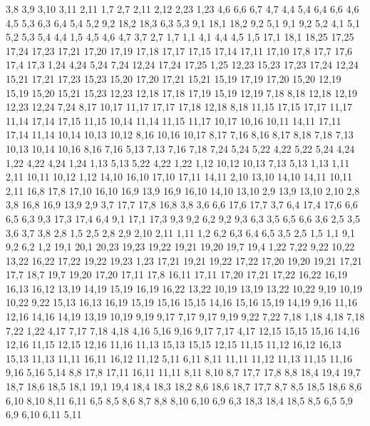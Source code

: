 3,8
3,9
3,10
3,11
2,11
%
1,7
2,7
2,11
2,12
2,23
1,23
%
4,6
6,6
6,7
4,7
%
4,4
5,4
6,4
6,6
4,6
4,5
%
5,3
6,3
6,4
5,4
%
5,2
9,2
18,2
18,3
6,3
5,3
%
9,1
18,1
18,2
9,2
%
5,1
9,1
9,2
5,2
%
4,1
5,1
5,2
5,3
5,4
4,4
%
1,5
4,5
4,6
4,7
3,7
2,7
1,7
%
1,1
4,1
4,4
4,5
1,5
17,1
18,1
18,25
17,25
17,24
17,23
17,21
17,20
17,19
17,18
17,17
17,15
17,14
17,11
17,10
17,8
17,7
17,6
17,4
17,3
%
1,24
4,24
5,24
7,24
12,24
17,24
17,25
1,25
%
12,23
15,23
17,23
17,24
12,24
%
15,21
17,21
17,23
15,23
%
15,20
17,20
17,21
15,21
%
15,19
17,19
17,20
15,20
%
12,19
15,19
15,20
15,21
15,23
12,23
%
12,18
17,18
17,19
15,19
12,19
%
7,18
8,18
12,18
12,19
12,23
12,24
7,24
%
8,17
10,17
11,17
17,17
17,18
12,18
8,18
%
11,15
17,15
17,17
11,17
%
11,14
17,14
17,15
11,15
%
10,14
11,14
11,15
11,17
10,17
10,16
%
10,11
14,11
17,11
17,14
11,14
10,14
10,13
10,12
%
8,16
10,16
10,17
8,17
%
7,16
8,16
8,17
8,18
7,18
%
7,13
10,13
10,14
10,16
8,16
7,16
%
5,13
7,13
7,16
7,18
7,24
5,24
5,22
%
4,22
5,22
5,24
4,24
%
1,22
4,22
4,24
1,24
%
1,13
5,13
5,22
4,22
1,22
%
1,12
10,12
10,13
7,13
5,13
1,13
%
1,11
2,11
10,11
10,12
1,12
%
14,10
16,10
17,10
17,11
14,11
%
2,10
13,10
14,10
14,11
10,11
2,11
%
16,8
17,8
17,10
16,10
16,9
%
13,9
16,9
16,10
14,10
13,10
%
2,9
13,9
13,10
2,10
%
2,8
3,8
16,8
16,9
13,9
2,9
%
3,7
17,7
17,8
16,8
3,8
%
3,6
6,6
17,6
17,7
3,7
%
6,4
17,4
17,6
6,6
6,5
%
6,3
9,3
17,3
17,4
6,4
%
9,1
17,1
17,3
9,3
9,2
%
6,2
9,2
9,3
6,3
%
3,5
6,5
6,6
3,6
%
2,5
3,5
3,6
3,7
3,8
2,8
%
1,5
2,5
2,8
2,9
2,10
2,11
1,11
%
1,2
6,2
6,3
6,4
6,5
3,5
2,5
1,5
%
1,1
9,1
9,2
6,2
1,2
19,1
20,1
20,23
19,23
19,22
19,21
19,20
19,7
19,4
%
1,22
7,22
9,22
10,22
13,22
16,22
17,22
19,22
19,23
1,23
%
17,21
19,21
19,22
17,22
%
17,20
19,20
19,21
17,21
%
17,7
18,7
19,7
19,20
17,20
17,11
17,8
%
16,11
17,11
17,20
17,21
17,22
16,22
16,19
16,13
16,12
%
13,19
14,19
15,19
16,19
16,22
13,22
%
10,19
13,19
13,22
10,22
%
9,19
10,19
10,22
9,22
%
15,13
16,13
16,19
15,19
15,16
15,15
%
14,16
15,16
15,19
14,19
%
9,16
11,16
12,16
14,16
14,19
13,19
10,19
9,19
9,17
%
7,17
9,17
9,19
9,22
7,22
7,18
%
1,18
4,18
7,18
7,22
1,22
%
4,17
7,17
7,18
4,18
%
4,16
5,16
9,16
9,17
7,17
4,17
%
12,15
15,15
15,16
14,16
12,16
%
11,15
12,15
12,16
11,16
%
11,13
15,13
15,15
12,15
11,15
%
11,12
16,12
16,13
15,13
11,13
%
11,11
16,11
16,12
11,12
%
5,11
6,11
8,11
11,11
11,12
11,13
11,15
11,16
9,16
5,16
5,14
%
8,8
17,8
17,11
16,11
11,11
8,11
8,10
%
8,7
17,7
17,8
8,8
%
18,4
19,4
19,7
18,7
18,6
18,5
%
18,1
19,1
19,4
18,4
18,3
18,2
%
8,6
18,6
18,7
17,7
8,7
%
8,5
18,5
18,6
8,6
%
6,10
8,10
8,11
6,11
%
6,5
8,5
8,6
8,7
8,8
8,10
6,10
6,9
%
6,3
18,3
18,4
18,5
8,5
6,5
%
5,9
6,9
6,10
6,11
5,11
